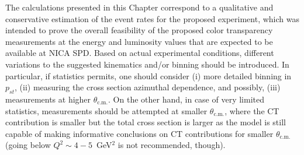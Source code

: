 The calculations presented in this Chapter correspond to a qualitative and conservative estimation of the event rates for the proposed experiment, which was intended to prove the overall feasibility of the proposed color transparency measurements at the energy and luminosity values that are expected to be available at NICA SPD. Based on actual experimental conditions, different variations to the suggested kinematics and/or binning should be introduced. In particular, if statistics permits, one should consider (i) more detailed binning in $p_{st}$, (ii) measuring the cross section azimuthal dependence, and possibly, (iii) measurements at higher $\theta_{\textrm{c.m.}}$. On the other hand, in case of very limited statistics, measurements should be attempted at smaller $\theta_{\textrm{c.m.}}$, where the CT contribution is smaller but the total cross section is larger as the model is still capable of making informative conclusions on CT contributions for smaller $\theta_{\textrm{c.m.}}$ (going below $Q^{2}\sim 4-5$~GeV$^{2}$ is not recommended, though).





